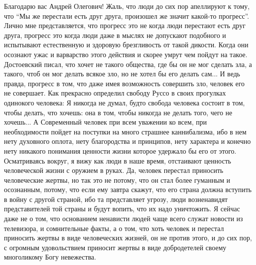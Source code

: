 \begin{itemize} %

Благодарю вас Андрей Олегович! Жаль, что люди до сих пор апеллируют к тому, что
\enquote{Мы же перестали есть друг друга, произошел же значит какой-то прогресс}. Лично
мне представляется, что прогресс это не когда люди перестают есть друг друга,
прогресс это когда люди даже в мыслях не допускают подобного и испытывают
естественную и здоровую брезгливость от такой дикости. Когда они осознают ужас
и варварство этого действия и скорее умрут чем пойдут на такое. Достоевский
писал, что хочет не такого общества, где бы он не мог сделать зла, а такого,
чтоб он мог делать всякое зло, но не хотел бы его делать сам... И ведь правда,
прогресс в том, что даже имея возможность совершить зло, человек его не
совершает. Как прекрасно определил свободу Руссо в своих прогулках одинокого
человека: Я никогда не думал, будто свобода человека состоит в том, чтобы
делать, что хочешь: она в том, чтобы никогда не делать того, чего не хочешь...
А Современный человек при всем уважении ко всем, при необходимости пойдет на
поступки на много страшнее каннибализма, ибо в нем нету духовного оплота, нету
благородства и принципов, нету характера и конечно нету никакого понимания
ценности жизни которое удержало бы его от этого. Осматриваясь вокруг, я вижу
как люди в наше время, отстаивают ценность человеческой жизни с оружием в
руках. Да, человек перестал приносить человеческие жертвы, но так это не
потому, что он стал более гуманным и осознанным, потому, что если ему завтра
скажут, что его страна должна вступить в войну с другой страной, ибо та
представляет угрозу, люди возненавидят представителей той страны и будут
вопить, что их надо уничтожить. Я сейчас даже не о том, что основанием
ненависти людей чаще всего служат новости из телевизора, и сомнительные факты,
а о том, что хоть человек и перестал приносить жертвы в виде человеческих
жизней, он не против этого, и до сих пор, с огромным удовольствием приносит
жертвы в виде добродетелей своему многоликому Богу невежества. 

\end{itemize} %
